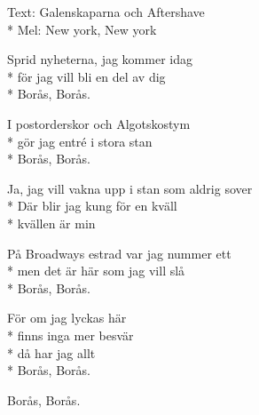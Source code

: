 \begin{SongText}
\begin{SongInfo}
    Text: Galenskaparna och Aftershave\\*%
    Mel: New york, New york
\end{SongInfo}
\begin{SongVerse}
Sprid nyheterna, jag kommer idag\\*%
för jag vill bli en del av dig\\*%
Borås, Borås.
\end{SongVerse}
\begin{SongVerse}
I postorderskor och Algotskostym\\*%
gör jag entré i stora stan\\*%
Borås, Borås.
\end{SongVerse}
\begin{SongVerse}
Ja, jag vill vakna upp i stan som aldrig sover\\*%
Där blir jag kung för en kväll\\*%
kvällen är min
\end{SongVerse}
\begin{SongVerse}
På Broadways estrad var jag nummer ett\\*%
men det är här som jag vill slå\\*%
Borås, Borås.
\end{SongVerse}
\begin{SongVerse}
För om jag lyckas här\\*%
finns inga mer besvär\\*%
då har jag allt\\*%
Borås, Borås.
\end{SongVerse}
\begin{SongVerse}
Borås, Borås. 

\end{SongVerse}
\end{SongText}
